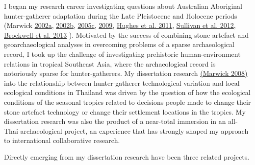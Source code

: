 \documentclass[11pt,article,oneside]{memoir}
\begin{document}
I began my research career investigating questions about Australian Aboriginal hunter-gatherer adaptation during the Late Pleistocene and Holocene periods (Marwick {\href{http://hdl.handle.net/1885/42085}{2002a}}, {\href{http://dx.doi.org/10.6084/m9.figshare.765251}{2002b}}, {\href{http://faculty.washington.edu/bmarwick/PDFs/Marwick_2005_Marillana_A.pdf}{2005c}},  \href{http://faculty.washington.edu/bmarwick/PDFs/Marwick_2009_AO_Pilbara.pdf}{2009},  \href{http://faculty.washington.edu/bmarwick/PDFs/Hughes_et_al_2011_JASSA.pdf}{Hughes et al. 2011},  \href{http://faculty.washington.edu/bmarwick/PDFs/Sullivan_et_al_2012_OSL_dates_ODX.pdf}{Sullivan et al. 2012},  \href{http://faculty.washington.edu/bmarwick/PDFs/Brockwell_et_al_2013_AA.pdf}{Brockwell et al. 2013} ). Motivated by the success of combining stone artefact and geoarchaeological analyses in overcoming problems of a sparse archaeological record, I took up the challenge of  investigating prehistoric human-environment relations in tropical Southeast Asia, where the archaeological record is notoriously sparse for hunter-gatherers. My dissertation research {\href{http://dx.doi.org/10.6084/m9.figshare.765252}{(Marwick 2008)}} into the relationship between hunter-gatherer technological variation and local ecological conditions in Thailand was driven by the question of how the ecological conditions of the seasonal tropics related to decisions people made to change their stone artefact technology or change their settlement locations in the tropics. My dissertation research was also the product of a near-total immersion in an all-Thai archaeological project, an experience that has strongly shaped my approach to international collaborative research. 

\newpage   


Directly emerging from my dissertation research have been three related projects.
\end{document}
